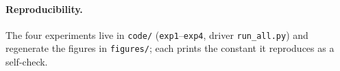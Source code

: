 \documentclass[11pt]{article}
\theoremstyle{plain}
\theoremstyle{definition}
\theoremstyle{remark}
\begin{document}
\paragraph{Reproducibility.}
The four experiments live in \texttt{code/} (\texttt{exp1}--\texttt{exp4},
driver \texttt{run\_all.py}) and regenerate the figures in \texttt{figures/}; each
prints the constant it reproduces as a self-check.

\small


\end{document}
